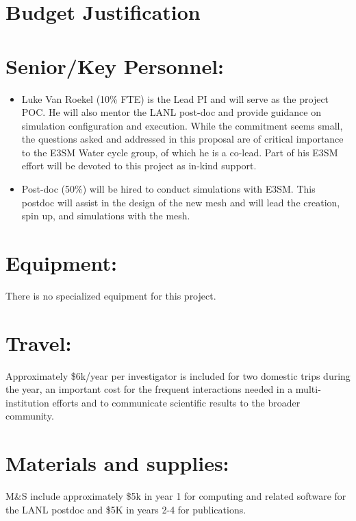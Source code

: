 \section{Budget Justification}

 \section*{Senior/Key Personnel:}
\begin{itemize}
\item Luke Van Roekel (10\% FTE) is the Lead PI and will serve as the project POC.  He will also mentor the LANL post-doc and provide guidance on simulation configuration and execution.  While the commitment seems small, the questions asked and addressed in this proposal are of critical importance to the E3SM Water cycle group, of which he is a co-lead.  Part of his E3SM effort will be devoted to this project as in-kind support.

\item Post-doc (50\%)  will be hired to conduct simulations with E3SM.  This postdoc will assist in the design of the new mesh and will lead the creation, spin up, and simulations with the mesh.

\end{itemize}
%
\section*{Equipment:}
There is no specialized equipment for this project.
%
\section*{Travel:}
Approximately \$6k/year per investigator is included for two domestic trips during the year, an important cost for
the frequent interactions needed in a multi-institution efforts and to communicate scientific results to the broader community.

\section*{Materials and supplies:}
M\&S include approximately \$5k in year 1 for computing and related software for the LANL postdoc and \$5K in years 2-4 for publications.

